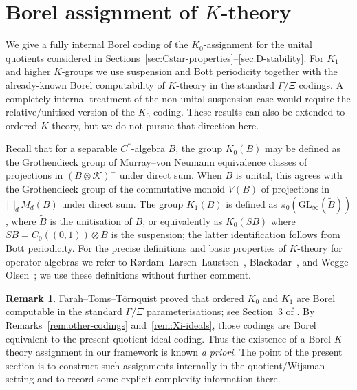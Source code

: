\documentclass[12pt,fleqn,a4paper]{amsart}
\numberwithin{equation}{section}
\theoremstyle{definition}
\newtheorem{remark}[theorem]{Remark}
\begin{document}
\section{Borel assignment of \texorpdfstring{$K$}{K}-theory}\label{sec:K0}

We give a fully internal Borel coding of the $K_0$-assignment for the unital
quotients considered in Sections~\ref{sec:Cstar-properties}--\ref{sec:D-stability}.
For $K_1$ and higher $K$-groups we use suspension and Bott periodicity together
with the already-known Borel computability of $K$-theory in the standard
$\Gamma/\Xi$ codings.  A completely internal treatment of the non-unital
suspension case would require the relative/unitised version of the $K_0$ coding.
These results can also be extended to ordered $K$-theory, but we do not pursue that
direction here.

Recall that for a separable $C^*$-algebra $B$, the group $K_0(B)$ may be defined as
the Grothendieck group of Murray--von Neumann equivalence classes of projections in
$(B\otimes\mathcal K)^+$ under direct sum.  When $B$ is unital, this agrees with the
Grothendieck group of the commutative monoid $V(B)$ of projections in
$\bigsqcup_d M_d(B)$ under direct sum.
The group $K_1(B)$ is defined as $\pi_0(\mathrm{GL}_\infty(\widetilde B))$, where
$\widetilde B$ is the unitisation of $B$, or equivalently as $K_0(SB)$ where
$SB=C_0((0,1))\otimes B$ is the suspension; the latter identification follows from
Bott periodicity.
For the precise definitions and basic properties of $K$-theory for operator algebras we
refer to R{\o}rdam--Larsen--Laustsen~\cite{RordamLarsenLaustsen},
Blackadar~\cite{Blackadar}, and Wegge-Olsen~\cite{WeggeOlsen}; we use these
definitions without further comment.


\begin{remark}
\label{rem:K-FTT-compare}
Farah--Toms--T\"ornquist proved that ordered $K_0$ and $K_1$ are Borel computable in
the standard $\Gamma/\Xi$ parameterisations; see Section~3 of
\cite{FarahTomsTornquist}.
By Remarks~\ref{rem:other-codings} and~\ref{rem:Xi-ideals}, those codings are Borel
equivalent to the present quotient-ideal coding.
Thus the existence of a Borel $K$-theory assignment in our framework is known
\emph{a priori}.  The point of the present section is to construct such assignments
internally in the quotient/Wijsman setting and to record some explicit complexity
information there.
\end{remark}
\end{document}

